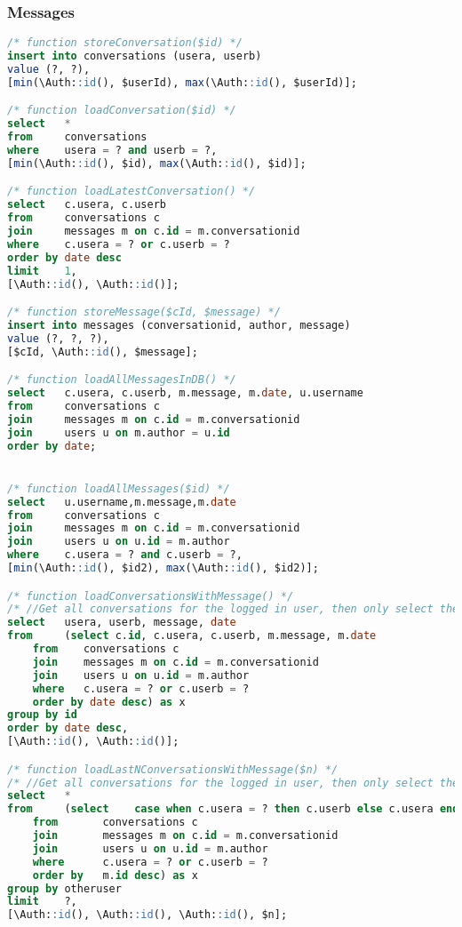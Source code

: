 \subsubsection{Messages}
\begin{lstlisting}[language=sql]
/* function storeConversation($id) */
insert into conversations (usera, userb)
value (?, ?),
[min(\Auth::id(), $userId), max(\Auth::id(), $userId)];

/* function loadConversation($id) */
select   *
from     conversations
where    usera = ? and userb = ?,
[min(\Auth::id(), $id), max(\Auth::id(), $id)];

/* function loadLatestConversation() */
select   c.usera, c.userb
from     conversations c
join     messages m on c.id = m.conversationid
where    c.usera = ? or c.userb = ?
order by date desc
limit    1,
[\Auth::id(), \Auth::id()];

/* function storeMessage($cId, $message) */
insert into messages (conversationid, author, message)
value (?, ?, ?),
[$cId, \Auth::id(), $message];

/* function loadAllMessagesInDB() */
select   c.usera, c.userb, m.message, m.date, u.username
from     conversations c
join     messages m on c.id = m.conversationid
join     users u on m.author = u.id
order by date;


/* function loadAllMessages($id) */
select   u.username,m.message,m.date
from     conversations c
join     messages m on c.id = m.conversationid
join     users u on u.id = m.author
where    c.usera = ? and c.userb = ?,
[min(\Auth::id(), $id2), max(\Auth::id(), $id2)];

/* function loadConversationsWithMessage() */
/* //Get all conversations for the logged in user, then only select the latest message for each of them */
select   usera, userb, message, date
from     (select c.id, c.usera, c.userb, m.message, m.date
    from    conversations c
    join    messages m on c.id = m.conversationid
    join    users u on u.id = m.author
    where   c.usera = ? or c.userb = ?
    order by date desc) as x
group by id
order by date desc,
[\Auth::id(), \Auth::id()];

/* function loadLastNConversationsWithMessage($n) */
/* //Get all conversations for the logged in user, then only select the latest message for each of them */
select   *
from     (select    case when c.usera = ? then c.userb else c.usera end as otheruser, image, message, is_read, author, date
    from       conversations c
    join       messages m on c.id = m.conversationid
    join       users u on u.id = m.author
    where      c.usera = ? or c.userb = ?
    order by   m.id desc) as x
group by otheruser
limit    ?,
[\Auth::id(), \Auth::id(), \Auth::id(), $n];


\end{lstlisting}

